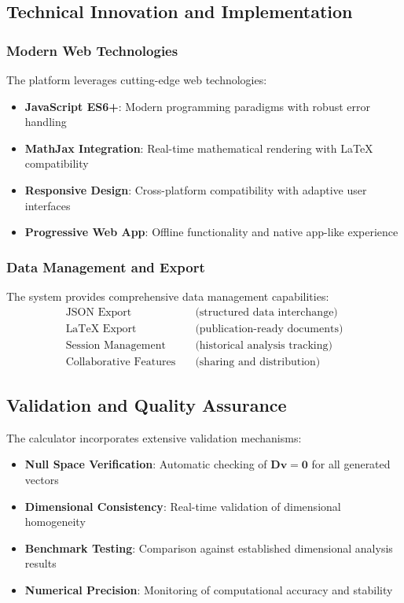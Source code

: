 \documentclass[
	11pt, %
	fleqn, %
	a4paper, %
]{LegrandOrangeBook}
\begin{document}
\subsection{Technical Innovation and Implementation}
\subsubsection{Modern Web Technologies}
The platform leverages cutting-edge web technologies:
\begin{itemize}
    \item \textbf{JavaScript ES6+}: Modern programming paradigms with robust error handling
    \item \textbf{MathJax Integration}: Real-time mathematical rendering with LaTeX compatibility
    \item \textbf{Responsive Design}: Cross-platform compatibility with adaptive user interfaces
    \item \textbf{Progressive Web App}: Offline functionality and native app-like experience
\end{itemize}

\subsubsection{Data Management and Export}
The system provides comprehensive data management capabilities:
\begin{align}
\text{JSON Export} &\quad \text{(structured data interchange)} \\
\text{LaTeX Export} &\quad \text{(publication-ready documents)} \\
\text{Session Management} &\quad \text{(historical analysis tracking)} \\
\text{Collaborative Features} &\quad \text{(sharing and distribution)}
\end{align}

\subsection{Validation and Quality Assurance}
The calculator incorporates extensive validation mechanisms:
\begin{itemize}
    \item \textbf{Null Space Verification}: Automatic checking of $\mathbf{D}\mathbf{v} = \mathbf{0}$ for all generated vectors
    \item \textbf{Dimensional Consistency}: Real-time validation of dimensional homogeneity
    \item \textbf{Benchmark Testing}: Comparison against established dimensional analysis results
    \item \textbf{Numerical Precision}: Monitoring of computational accuracy and stability
\end{itemize}
\end{document}
